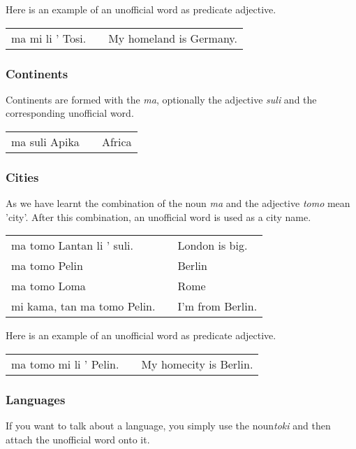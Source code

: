 Here is an example of an unofficial word as predicate adjective.

\begin{supertabular}{p{5,5cm}|ll}
ma mi li ' Tosi. && My homeland is Germany.  \\
\end{supertabular}

%
\subsubsection*{Continents}
%
Continents are formed with the \textit{ma}, optionally the adjective \textit{suli} and the corresponding unofficial word. 

\begin{supertabular}{p{2,5cm}|ll}
ma suli Apika && Africa \\
\end{supertabular}

%
\subsubsection*{Cities}
%
As we have learnt the combination of the noun \textit{ma} and the adjective \textit{tomo} mean 'city'.
After this combination, an unofficial word is used as a city name. 

\begin{supertabular}{p{5,5cm}|ll}
ma tomo Lantan li ' suli. && London is big. \\
ma tomo Pelin && Berlin \\
ma tomo Loma && Rome \\
mi kama, tan ma tomo Pelin. && I'm from Berlin. \\
\end{supertabular} 

Here is an example of an unofficial word as predicate adjective.

\begin{supertabular}{p{5,5cm}|ll}
ma tomo mi li ' Pelin. && My homecity is Berlin.  \\
\end{supertabular}

%
\subsubsection*{Languages}
%
If you want to talk about a language, you simply use the noun\textit{toki} and then attach the unofficial word onto it. 

